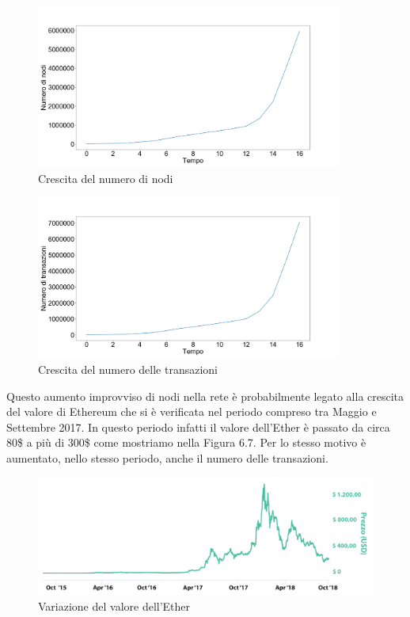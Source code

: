 \documentclass[12pt]{report}
\begin{document}
\begin{figure}[H]
\centering
\includegraphics[width=0.9\textwidth]{PlotNumNodi.png}
\caption{Crescita del numero di nodi}
\end{figure}

\begin{figure}[H]
\centering  
\includegraphics[width=0.9\textwidth]{PlotArchi.png}
\caption{Crescita del numero delle transazioni}
\end{figure}

Questo aumento improvviso di nodi nella rete è probabilmente legato alla crescita del valore di Ethereum che si è verificata nel periodo compreso tra Maggio e Settembre 2017. In questo periodo infatti il valore dell'Ether è passato da circa 80\$ a più di 300\$ come mostriamo nella Figura 6.7. Per lo stesso motivo è aumentato, nello stesso periodo, anche il numero delle transazioni.

\begin{figure}[H]
\centering  
\includegraphics[width=\textwidth]{chart-2.jpg}
\caption{Variazione del valore dell'Ether}
\end{figure}
\end{document}
